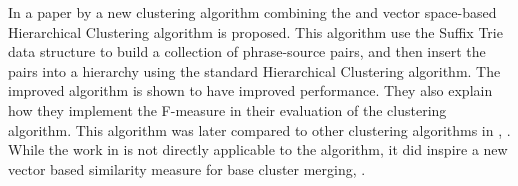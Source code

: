 In a paper by \cite{Chim2007} a new clustering algorithm combining the \STC and vector space-based Hierarchical Clustering algorithm is proposed. This algorithm use the Suffix Trie data structure to build a collection of phrase-source pairs, and then insert the pairs into a hierarchy using the standard Hierarchical Clustering algorithm. The improved algorithm is shown to have improved performance. They also explain how they implement the F-measure in their evaluation of the clustering algorithm. This algorithm was later compared to other clustering algorithms in , \parencite{Chim2008}. While the work in \cite{Chim2007} is not directly applicable to the \CTC algorithm, it did inspire a new vector based similarity measure for base cluster merging, \parencite{Moe2014}.